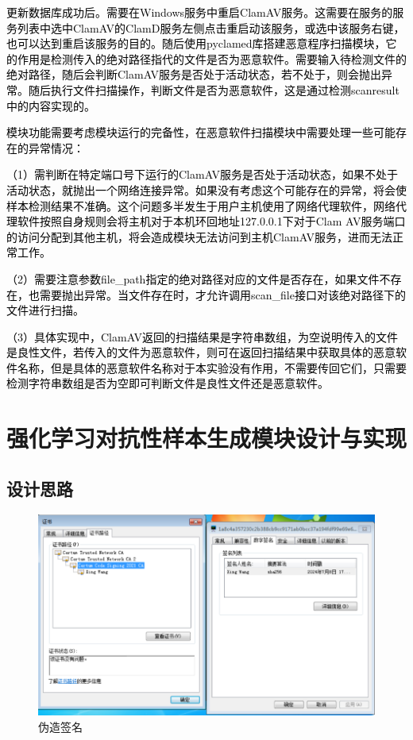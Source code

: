 \textcolor{black}{更新数据库成功后。需要在Windows服务中重启ClamAV服务。这需要在服务的服务列表中选中ClamAV的ClamD服务左侧点击重启动该服务，或选中该服务右键，也可以达到重启该服务的目的。随后使用pyclamed库搭建恶意程序扫描模块，它的作用是检测传入的绝对路径指代的文件是否为恶意软件。需要输入待检测文件的绝对路径，随后会判断ClamAV服务是否处于活动状态，若不处于，则会抛出异常。随后执行文件扫描操作，判断文件是否为恶意软件，这是通过检测scanresult中的内容实现的。}

\textcolor{black}{模块功能需要考虑模块运行的完备性，在恶意软件扫描模块中需要处理一些可能存在的异常情况：}

\textcolor{black}{（1）需判断在特定端口号下运行的ClamAV服务是否处于活动状态，如果不处于活动状态，就抛出一个网络连接异常。如果没有考虑这个可能存在的异常，将会使样本检测结果不准确。这个问题多半发生于用户主机使用了网络代理软件，网络代理软件按照自身规则会将主机对于本机环回地址127.0.0.1下对于Clam AV服务端口的访问分配到其他主机，将会造成模块无法访问到主机ClamAV服务，进而无法正常工作。}

\textcolor{black}{（2）需要注意参数file\_path指定的绝对路径对应的文件是否存在，如果文件不存在，也需要抛出异常。当文件存在时，才允许调用scan\_file接口对该绝对路径下的文件进行扫描。}

\textcolor{black}{（3）具体实现中，ClamAV返回的扫描结果是字符串数组，为空说明传入的文件是良性文件，若传入的文件为恶意软件，则可在返回扫描结果中获取具体的恶意软件名称，但是具体的恶意软件名称对于本实验没有作用，不需要传回它们，只需要检测字符串数组是否为空即可判断文件是良性文件还是恶意软件。}

\section{强化学习对抗性样本生成模块设计与实现}

\subsection{设计思路}

\begin{figure}[htbp]
  \centering
  \includegraphics[]{images/certification_fabrication.png}
  \caption{伪造签名}\label{fig:certification_fabrication}
\end{figure}


